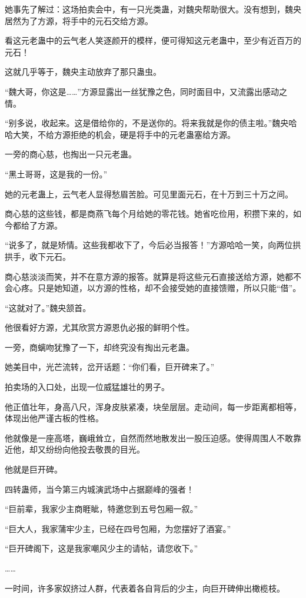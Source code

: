 \begin{this_body}
她事先了解过：这场拍卖会中，有一只光类蛊，对魏央帮助很大。没有想到，魏央居然为了方源，将手中的元石交给方源。

看这元老蛊中的云气老人笑逐颜开的模样，便可得知这元老蛊中，至少有近百万的元石！

这就几乎等于，魏央主动放弃了那只蛊虫。

“魏大哥，你这是……”方源显露出一丝犹豫之色，同时面目中，又流露出感动之情。

“别多说，收起来。这是借给你的，不是送你的。将来我就是你的债主啦。”魏央哈哈大笑，不给方源拒绝的机会，硬是将手中的元老蛊塞给方源。

一旁的商心慈，也掏出一只元老蛊。

“黑土哥哥，这是我的一份。”

她的元老蛊上，云气老人显得愁眉苦脸。可见里面元石，在十万到三十万之间。

商心慈的这些钱，都是商燕飞每个月给她的零花钱。她省吃俭用，积攒下来的，如今都给了方源。

“说多了，就是矫情。这些我都收下了，今后必当报答！”方源哈哈一笑，向两位拱拱手，收下元石。

商心慈淡淡而笑，并不在意方源的报答。就算是将这些元石直接送给方源，她都不会心疼。只是她知道，以方源的性格，却不会接受她的直接馈赠，所以只能“借”。

“这就对了。”魏央颔首。

他很看好方源，尤其欣赏方源恩仇必报的鲜明个性。

一旁，商螭吻犹豫了一下，却终究没有掏出元老蛊。

她美目中，光芒流转，岔开话题：“你们看，巨开碑来了。”

拍卖场的入口处，出现一位威猛雄壮的男子。

他正值壮年，身高八尺，浑身皮肤紧凑，块垒层层。走动间，每一步距离都相等，体现出他严谨古板的性格。

他就像是一座高塔，巍峨耸立，自然而然地散发出一股压迫感。使得周围人不敢靠近他，却又纷纷向他投去敬畏的目光。

他就是巨开碑。

四转蛊师，当今第三内城演武场中占据巅峰的强者！

“巨前辈，我家少主商睚眦，特邀您到五号包厢一叙。”

“巨大人，我家蒲牢少主，已经在四号包厢，为您摆好了酒宴。”

“巨开碑阁下，这是我家嘲风少主的请帖，请您收下。”

……

一时间，许多家奴挤过人群，代表着各自背后的少主，向巨开碑伸出橄榄枝。


\end{this_body}
